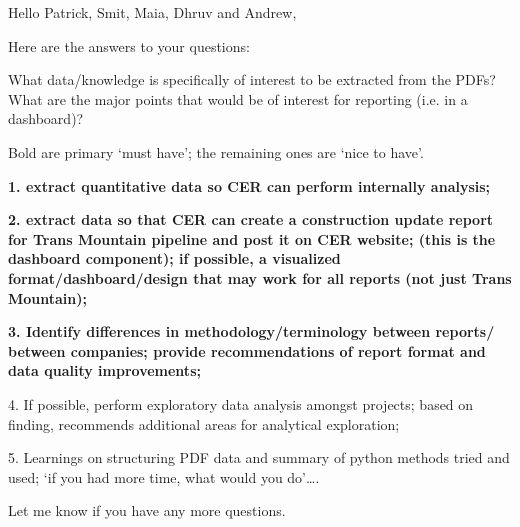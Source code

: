 Hello Patrick, Smit, Maia, Dhruv and Andrew,

Here are the answers to your questions:

 

What data/knowledge is specifically of interest to be extracted from the PDFs?  What are the major points that would be of interest for reporting (i.e. in a dashboard)?

 

Bold are primary ‘must have’; the remaining ones are ‘nice to have’.

 

\textbf{1. extract quantitative data so CER can perform internally analysis;}

\textbf{2. extract data so that CER can create a construction update report for Trans Mountain pipeline and post it on CER website; (this is the dashboard component); if possible, a visualized format/dashboard/design that may work for all reports (not just Trans Mountain);}  

\textbf{3. Identify differences in methodology/terminology between reports/ between companies; provide recommendations of report format and data quality improvements;}

4. If possible, perform exploratory data analysis amongst projects; based on finding, recommends additional areas for analytical exploration;

5. Learnings on structuring PDF data and summary of python methods tried and used; ‘if you had more time, what would you do’….

 

Let me know if you have any more questions.